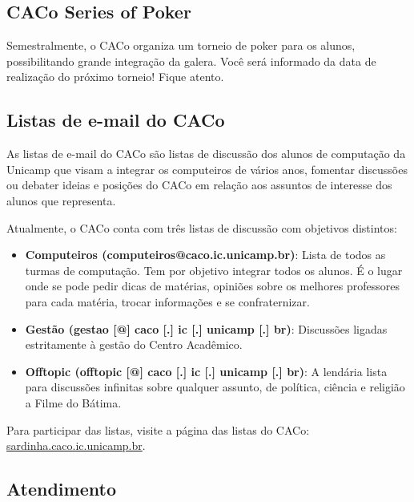 \subsection{CACo Series of Poker}

Semestralmente, o CACo organiza um torneio de poker para os alunos,
possibilitando grande integração da galera. Você será informado da data de
realização do próximo torneio! Fique atento.

\subsection{Listas de e-mail do CACo}

As listas de e-mail do CACo são listas de discussão dos alunos de computação da
Unicamp que visam a integrar os computeiros de vários anos, fomentar discussões
ou debater ideias e posições do CACo em relação aos assuntos de interesse dos
alunos que representa.

Atualmente, o CACo conta com três listas de discussão com objetivos distintos:

\begin{itemize}
\item  \textbf{Computeiros (computeiros@caco.ic.unicamp.br)}: Lista de todos as turmas de computação. Tem por objetivo integrar todos os alunos. É o lugar onde se pode pedir dicas de matérias, opiniões sobre os melhores professores para cada matéria, trocar informações e se confraternizar.
\end{itemize}

\begin{itemize}
\item  \textbf{Gestão (gestao [@] caco [.] ic [.] unicamp [.] br)}: Discussões ligadas estritamente à gestão do Centro Acadêmico.
\end{itemize}

\begin{itemize}
\item  \textbf{Offtopic (offtopic [@] caco [.] ic [.] unicamp [.] br)}: A lendária lista para discussões infinitas sobre qualquer assunto, de política, ciência e religião a Filme do Bátima.
\end{itemize}

Para participar das listas, visite a página das listas do CACo:
\url{sardinha.caco.ic.unicamp.br}.

\subsection{Atendimento}

